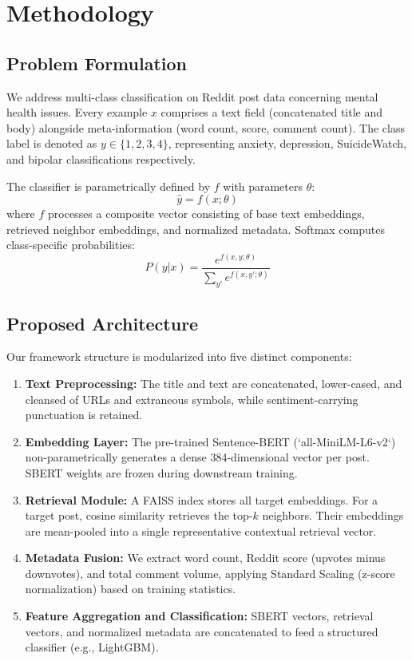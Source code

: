 \documentclass[11pt]{article}
\begin{document}
\section{Methodology}

\subsection{Problem Formulation}

We address multi-class classification on Reddit post data concerning mental health issues. Every example $x$ comprises a text field (concatenated title and body) alongside meta-information (word count, score, comment count). The class label is denoted as $y \in \{1, 2, 3, 4\}$, representing anxiety, depression, SuicideWatch, and bipolar classifications respectively.

The classifier is parametrically defined by $f$ with parameters $\theta$:
\begin{equation}
\hat{y}=f(x; \theta)
\end{equation}
where $f$ processes a composite vector consisting of base text embeddings, retrieved neighbor embeddings, and normalized metadata. Softmax computes class-specific probabilities:
\begin{equation}
P(y | x) = \frac{e^{f(x, y; \theta)}}{\sum_{y'} e^{f(x, y'; \theta)}}
\end{equation}

\subsection{Proposed Architecture}

Our framework structure is modularized into five distinct components:
\begin{enumerate}
    \item \textbf{Text Preprocessing:} The title and text are concatenated, lower-cased, and cleansed of URLs and extraneous symbols, while sentiment-carrying punctuation is retained.
    \item \textbf{Embedding Layer:} The pre-trained Sentence-BERT (`all-MiniLM-L6-v2`) non-parametrically generates a dense 384-dimensional vector per post. SBERT weights are frozen during downstream training.
    \item \textbf{Retrieval Module:} A FAISS index stores all target embeddings. For a target post, cosine similarity retrieves the top-$k$ neighbors. Their embeddings are mean-pooled into a single representative contextual retrieval vector.
    \item \textbf{Metadata Fusion:} We extract word count, Reddit score (upvotes minus downvotes), and total comment volume, applying Standard Scaling (z-score normalization) based on training statistics.
    \item \textbf{Feature Aggregation and Classification:} SBERT vectors, retrieval vectors, and normalized metadata are concatenated to feed a structured classifier (e.g., LightGBM).
\end{enumerate}
\end{document}
